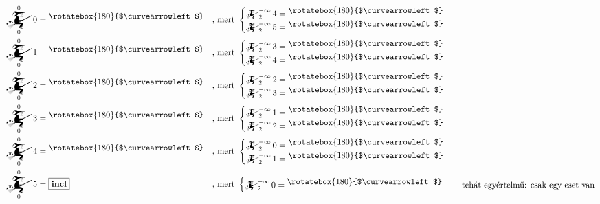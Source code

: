 \documentclass{article}
\newcommand{\nothing}{\text{\raisebox{0.4em}{\rotatebox{180}{$\curvearrowleft$}}}}%
\newcommand{\just}[1]{\boxed{#1}}%
\newcommand{\incl}{\mathbf{incl}}
\newcommand{\mainfun}[3]{\mathwitch_{#1}^{#2}#3}
\begin{document}
	\begin{align*}
		\mainfun0{0}0  &= \nothing    &&\text{, mert }\begin{cases}\mainfun2{-\infty}4 = \nothing\\\mainfun2{-\infty}5 = \nothing&\end{cases} \\
		\mainfun0{0}1  &= \nothing    &&\text{, mert }\begin{cases}\mainfun2{-\infty}3 = \nothing\\\mainfun2{-\infty}4 = \nothing&\end{cases} \\
		\mainfun0{0}2  &= \nothing    &&\text{, mert }\begin{cases}\mainfun2{-\infty}2 = \nothing\\\mainfun2{-\infty}3 = \nothing&\end{cases} \\
		\mainfun0{0}3  &= \nothing    &&\text{, mert }\begin{cases}\mainfun2{-\infty}1 = \nothing\\\mainfun2{-\infty}2 = \nothing&\end{cases} \\
		\mainfun0{0}4  &= \nothing    &&\text{, mert }\begin{cases}\mainfun2{-\infty}0 = \nothing\\\mainfun2{-\infty}1 = \nothing&\end{cases} \\
		\mainfun0{0}5  &= \just \incl &&\text{, mert }\begin{cases}\mainfun2{-\infty}0 = \nothing&\text{--- tehát egyértelmű: csak egy eset van}\end{cases}
	\end{align*}
\end{document}
